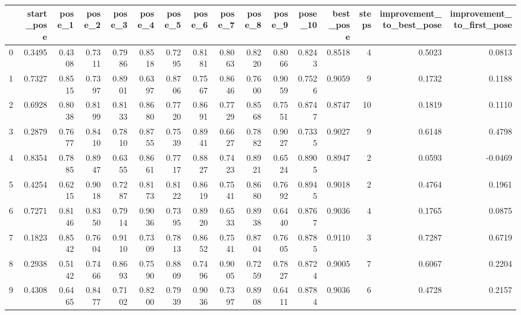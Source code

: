 \begin{tabular}{lrrrrrrrrrrrrrrr}
\toprule
{} &  start\_pose &  pose\_1 &  pose\_2 &  pose\_3 &  pose\_4 &  pose\_5 &  pose\_6 &  pose\_7 &  pose\_8 &  pose\_9 &  pose\_10 &  best\_pose &  steps &  improvement\_to\_best\_pose &  improvement\_to\_first\_pose \\
\midrule
0   &      0.3495 &  0.4308 &  0.7311 &  0.7986 &  0.8518 &  0.7295 &  0.8181 &  0.8063 &  0.8220 &  0.8066 &   0.8243 &     0.8518 &      4 &                    0.5023 &                     0.0813 \\
1   &      0.7327 &  0.8515 &  0.7397 &  0.8901 &  0.6397 &  0.8706 &  0.7567 &  0.8646 &  0.7600 &  0.9059 &   0.7526 &     0.9059 &      9 &                    0.1732 &                     0.1188 \\
2   &      0.6928 &  0.8038 &  0.8199 &  0.8133 &  0.8680 &  0.7720 &  0.8691 &  0.7729 &  0.8568 &  0.7551 &   0.8747 &     0.8747 &     10 &                    0.1819 &                     0.1110 \\
3   &      0.2879 &  0.7677 &  0.8410 &  0.7810 &  0.8755 &  0.7539 &  0.8941 &  0.6627 &  0.7882 &  0.9027 &   0.7335 &     0.9027 &      9 &                    0.6148 &                     0.4798 \\
4   &      0.8354 &  0.7885 &  0.8947 &  0.6355 &  0.8661 &  0.7717 &  0.8827 &  0.7423 &  0.8921 &  0.6524 &   0.8905 &     0.8947 &      2 &                    0.0593 &                    -0.0469 \\
5   &      0.4254 &  0.6215 &  0.9018 &  0.7287 &  0.8173 &  0.8122 &  0.8619 &  0.7541 &  0.8680 &  0.7692 &   0.8945 &     0.9018 &      2 &                    0.4764 &                     0.1961 \\
6   &      0.7271 &  0.8146 &  0.8350 &  0.7914 &  0.9036 &  0.7395 &  0.8920 &  0.6533 &  0.8938 &  0.6440 &   0.8767 &     0.9036 &      4 &                    0.1765 &                     0.0875 \\
7   &      0.1823 &  0.8542 &  0.7604 &  0.9110 &  0.7309 &  0.7813 &  0.8652 &  0.7541 &  0.8704 &  0.7605 &   0.8785 &     0.9110 &      3 &                    0.7287 &                     0.6719 \\
8   &      0.2938 &  0.5142 &  0.7466 &  0.8693 &  0.7590 &  0.8809 &  0.7496 &  0.9005 &  0.7259 &  0.7827 &   0.8724 &     0.9005 &      7 &                    0.6067 &                     0.2204 \\
9   &      0.4308 &  0.6465 &  0.8477 &  0.7102 &  0.8200 &  0.7939 &  0.9036 &  0.7397 &  0.8908 &  0.6411 &   0.8784 &     0.9036 &      6 &                    0.4728 &                     0.2157 \\

\end{tabular}
